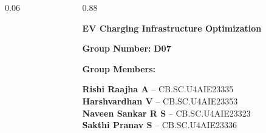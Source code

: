 \documentclass[aspectratio=169,10pt]{beamer}
\begin{document}
\begin{frame}[plain]

\vspace{0.65cm}

\begin{columns}[c]

\begin{column}{0.06\textwidth}
\end{column}

\begin{column}{0.88\textwidth}

{\fontsize{24}{29}\selectfont
\color{Navy}
\textbf{EV Charging Infrastructure Optimization}}\\[-1mm]

\vspace{0.55cm}

{\large
\textbf{Group Number:} \color{Teal}\textbf{D07}
}

\vspace{0.35cm}

{\large
\color{Navy}
\textbf{Group Members:}
}

\vspace{0.18cm}

{\normalsize
\textbf{Rishi Raajha A} -- CB.SC.U4AIE23335\\[1.5mm]
\textbf{Harshvardhan V} -- CB.SC.U4AIE23353\\[1.5mm]
\textbf{Naveen Sankar R S} -- CB.SC.U4AIE23323\\[1.5mm]
\textbf{Sakthi Pranav S} -- CB.SC.U4AIE23336
}

\end{column}

\end{columns}

\end{frame}
\end{document}
